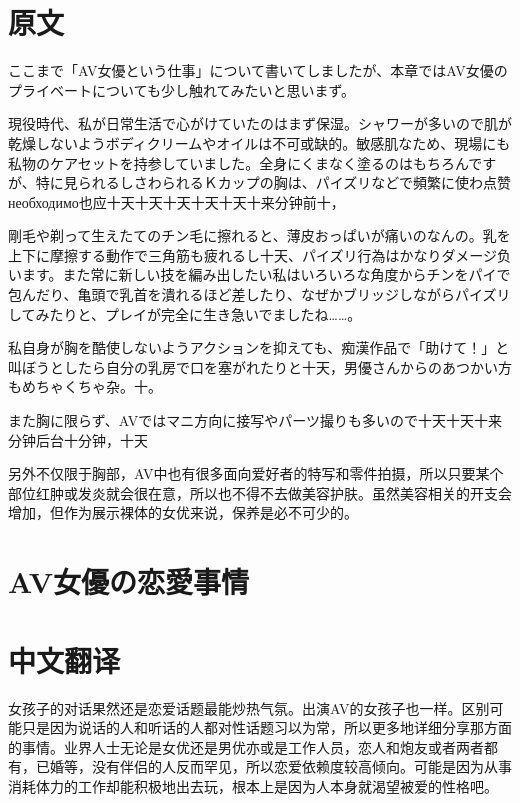 \documentclass[12pt,UTF8]{ctexbook}
\begin{document}
\section*{原文}

ここまで「AV女優という仕事」について書いてしましたが、本章ではAV女優のプライベートについても少し触れてみたいと思いまず。

現役時代、私が日常生活で心がけていたのはまず保湿。シャワーが多いので肌が乾燥しないようボディクリームやオイルは不可或缺的。敏感肌なため、現場にも私物のケアセットを持参していました。全身にくまなく塗るのはもちろんですが、特に見られるしさわられるＫカップの胸は、パイズリなどで頻繁に使わ点赞 необходимо也应十天十天十天十天十天十来分钟前十，

剛毛や剃って生えたてのチン毛に擦れると、薄皮おっぱいが痛いのなんの。乳を上下に摩擦する動作で三角筋も疲れるし十天、パイズリ行為はかなりダメージ负います。また常に新しい技を編み出したい私はいろいろな角度からチンをパイで包んだり、亀頭で乳首を潰れるほど差したり、なぜかブリッジしながらパイズリしてみたりと、プレイが完全に生き急いでましたね……。

私自身が胸を酷使しないようアクションを抑えても、痴漢作品で「助けて！」と叫ぼうとしたら自分の乳房で口を塞がれたりと十天，男優さんからのあつかい方もめちゃくちゃ杂。十。

また胸に限らず、AVではマニ方向に接写やパーツ撮りも多いので十天十天十来分钟后台十分钟，十天

另外不仅限于胸部，AV中也有很多面向爱好者的特写和零件拍摄，所以只要某个部位红肿或发炎就会很在意，所以也不得不去做美容护肤。虽然美容相关的开支会增加，但作为展示裸体的女优来说，保养是必不可少的。

\switchcolumn

\section{AV女優の恋愛事情}

\switchcolumn

\section*{中文翻译}

女孩子的对话果然还是恋爱话题最能炒热气氛。出演AV的女孩子也一样。区别可能只是因为说话的人和听话的人都对性话题习以为常，所以更多地详细分享那方面的事情。业界人士无论是女优还是男优亦或是工作人员，恋人和炮友或者两者都有，已婚等，没有伴侣的人反而罕见，所以恋爱依赖度较高倾向。可能是因为从事消耗体力的工作却能积极地出去玩，根本上是因为人本身就渴望被爱的性格吧。
\end{document}
